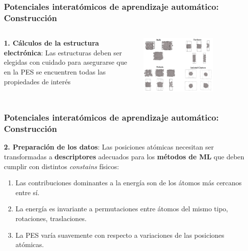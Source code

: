 \documentclass[aspectratio=169]{beamer}
\let\oldtextbf\textbf
\renewcommand{\textbf}[1]{\textcolor{nordblue}{\oldtextbf{#1}}}
\begin{document}
    \begin{frame}
        \frametitle{Potenciales interatómicos de aprendizaje automático: Construcción}
        
        \begin{columns}
            \textbf{1. Cálculos de la estructura electrónica}: Las estructuras deben
            ser elegidas con cuidado para asegurarse que en la PES se encuentren 
            todas las propiedades de interés

            \begin{center}
                \includegraphics[width=0.65\textwidth]{intro-dft_data.png}
            \end{center}
        \end{columns}

    \end{frame}
    
    \begin{frame}
        \frametitle{Potenciales interatómicos de aprendizaje automático: Construcción}

        \textbf{2. Preparación de los datos}: Las posiciones atómicas necesitan 
        ser transformadas a \textbf{descriptores} adecuados para los 
        \textbf{métodos de ML} que deben cumplir con distintos \textit{constains} 
        físicos:
        \begin{enumerate}
            \item Las contribuciones dominantes a la energía son de los átomos 
                más cercanos entre sí.
            \item La energía es invariante a permutaciones entre átomos del mismo 
                tipo, rotaciones, traslaciones.
            \item La PES varía suavemente con respecto a variaciones de las
                posiciones atómicas.
        \end{enumerate}

	\end{frame}
    
\end{document}
